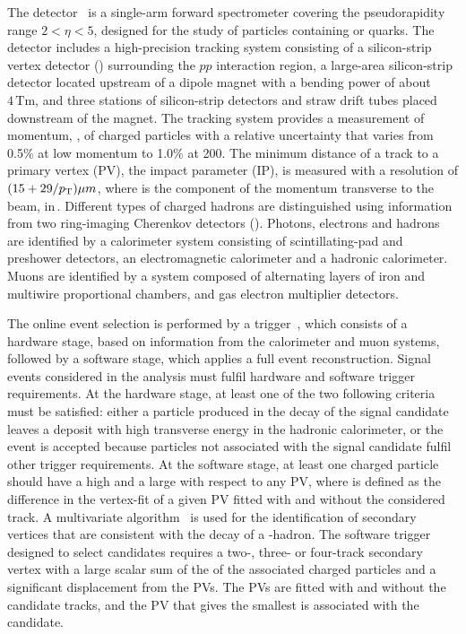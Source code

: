 The \lhcb detector~\cite{Alves:2008zz,LHCb-DP-2014-002} is a single-arm forward spectrometer covering the \mbox{pseudorapidity} range $2<\eta <5$, designed for the study of particles containing \bquark or \cquark quarks. The detector includes a high-precision tracking system consisting of a silicon-strip vertex detector (\velo) surrounding the $pp$ interaction region, a large-area silicon-strip detector located upstream of a dipole magnet with a bending power of about $4{\mathrm{\,Tm}}$, and three stations of silicon-strip detectors and straw drift tubes placed downstream of the magnet. The tracking system provides a measurement of momentum, \ptot, of charged particles with a relative uncertainty that varies from 0.5\% at low momentum to 1.0\% at 200\gevc. The minimum distance of a track to a primary vertex (PV), the impact parameter (IP), is measured with a resolution of $(15+29/\mbox{$p_{\mathrm{ T}}$})\mu m$, where \pt is the component of the momentum transverse to the beam, in\,\gevc. Different types of charged hadrons are distinguished using information from two ring-imaging Cherenkov detectors (\rich). Photons, electrons and hadrons are identified by a calorimeter system consisting of scintillating-pad and preshower detectors, an electromagnetic calorimeter and a hadronic calorimeter. Muons are identified by a system composed of alternating layers of iron and multiwire proportional chambers, and gas electron multiplier detectors. 

The online event selection is performed by a trigger~\cite{LHCb-DP-2012-004}, which consists of a hardware stage, based on information from the calorimeter and muon systems, followed by a software stage, which applies a full event reconstruction. Signal events considered in the analysis must fulfil hardware and software trigger requirements. At the hardware stage, at least one of the two following criteria must be satisfied: either a particle produced in the decay of the signal \Bm candidate leaves a deposit with high transverse energy in the hadronic calorimeter, or the event is accepted because particles not associated with the signal candidate fulfil other trigger requirements.
At the software stage, at least one charged particle should have a high \pt and a large \chisqip with respect to any PV, where \chisqip is defined as the difference in the vertex-fit \chisq of a given PV fitted with and without the considered track. A multivariate algorithm~\cite{BBDT} is used for the identification of secondary vertices that are consistent with the decay of a \bquark-hadron.
The software trigger designed to select \decay{\Bm}{\D\Kstarm} candidates requires a two-, three- or four-track secondary vertex with a large scalar sum of the \pt of the associated charged particles and a significant displacement from the PVs.
The PVs are fitted with and without the \B candidate tracks, and the PV that gives the smallest \chisqip is associated with the \B candidate.

